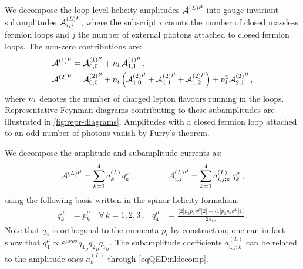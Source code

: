 \documentclass[main.tex]{subfiles}
\begin{document}
We decompose the loop-level helicity amplitudes ${\mathcal{A}^{(L)}}^{\mu}$ into gauge-invariant
subamplitudes ${\mathcal{A}^{(L)}_{i, j}}^{\mu}$, where the subscript $i$ counts the number of
closed massless fermion loops and $j$ the number of external photons attached
to closed fermion loops. The non-zero contributions are:
\begin{subequations}
    \label{eqQED:nldecomp}
    \begin{align}
        {\mathcal{A}^{(1)}}^{\mu} &= {\mathcal{A}^{(1)}_{0, 0}}^{\mu} + n_l \, {\mathcal{A}^{(1)}_{1, 1}}^{\mu} \,, \\*
        {\mathcal{A}^{(2)}}^{\mu} &= {\mathcal{A}^{(2)}_{0, 0}}^{\mu}
        + n_l \left( {\mathcal{A}^{(2)}_{1, 0}}^{\mu} + {\mathcal{A}^{(2)}_{1, 1}}^{\mu} + {\mathcal{A}^{(2)}_{1, 2}}^{\mu} \right)
        + n_l^2 {\mathcal{A}^{(2)}_{2, 1}}^{\mu} \,,
    \end{align}
\end{subequations}
where $n_l$ denotes the number of charged lepton flavours running in the loops.
Representative Feynman diagrams contributing to these subamplitudes are illustrated in \cref{fig:repr-diagrams}.
Amplitudes with a closed fermion loop attached to an odd number of photons vanish by Furry's theorem.

We decompose the amplitude and subamplitude currents as:
\begin{align}
    \label{eqQED:offshellproj}
    {\mathcal{A}^{(L)}}^{\mu} = \sum_{k=1}^4 a_{k}^{(L)} \, q_k^\mu \,, \qquad \qquad {\mathcal{A}^{(L)}_{i, j}}^{\mu} = \sum_{k=1}^4 a_{i,j;k}^{(L)} \, q_k^\mu \,,
\end{align}
using the following basis written in the spinor-helicity formalism:
\begin{align}
    \label{eqQED:proj-basis}
    q_k^\mu &= p_k^\mu \quad\forall \, k=1,2,3 \,, &
    q_4^\mu &= \frac{\langle 2|p_3p_1\sigma^\mu|2 ] - \langle 1|p_3p_2\sigma^\mu|1 ]}{2 s_{12}} \,.
\end{align}
Note that $q_4$ is orthogonal to the momenta $p_i$ by construction; one can in fact show that $q_4^\mu\propto \varepsilon^{\mu\nu\rho\sigma}{q_1}_\nu{q_2}_\rho{q_3}_\sigma$. 
The subamplitude coefficients $a_{i,j;k}^{(L)}$ can be related to the amplitude ones $a_{k}^{(L)}$ through \cref{eqQED:nldecomp}.
\end{document}
